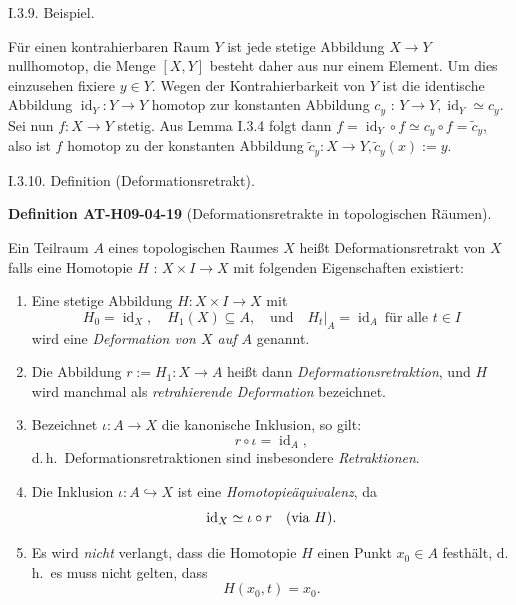 \documentclass[10pt, letterpaper]{article}
\newcommand{\CustomHeading}[3]{%
  \par\medskip\noindent%
  \textbf{#1 #2} \textnormal{(#3)}.\enskip%
}
\newenvironment{DEF}[2]{\begin{unitbox}\CustomHeading{Definition}{#1}{#2}}{\end{unitbox}}
\begin{document}
I.3.9. Beispiel. 

Für einen kontrahierbaren Raum $Y$ ist jede stetige Abbildung $X \rightarrow Y$ nullhomotop, die Menge $[X, Y]$ besteht daher aus nur einem Element. Um dies einzusehen fixiere $y \in Y$. Wegen der Kontrahierbarkeit von $Y$ ist die identische Abbildung $\operatorname{id}_{Y}: Y \rightarrow Y$ homotop zur konstanten Abbildung $c_{y}$ : $Y \rightarrow Y, \operatorname{id}_{Y} \simeq c_{y}$. Sei nun $f: X \rightarrow Y$ stetig. Aus Lemma I.3.4 folgt dann $f=\operatorname{id}_{Y} \circ f \simeq c_{y} \circ f=\tilde{c}_{y}$, also ist $f$ homotop zu der konstanten Abbildung $\tilde{c}_{y}: X \rightarrow Y, \tilde{c}_{y}(x):=y$.


I.3.10. Definition (Deformationsretrakt). 

\begin{DEF}{AT-H09-04-19}{Deformationsretrakte in topologischen Räumen}
Ein Teilraum $A$ eines topologischen Raumes $X$ heißt Deformationsretrakt von $X$ falls eine Homotopie $H$ : $X \times I \rightarrow X$ mit folgenden Eigenschaften existiert:
\begin{enumerate}
\item Eine stetige Abbildung \( H: X \times I \rightarrow X \) mit
\[
H_0 = \operatorname{id}_X, \quad H_1(X) \subseteq A, \quad \text{und} \quad H_t|_A = \operatorname{id}_A \ \text{für alle } t \in I
\]
wird eine \emph{Deformation von \( X \) auf \( A \)} genannt.

\item Die Abbildung \( r := H_1: X \rightarrow A \) heißt dann \emph{Deformationsretraktion}, und \( H \) wird manchmal als \emph{retrahierende Deformation} bezeichnet.

\item Bezeichnet \( \iota: A \rightarrow X \) die kanonische Inklusion, so gilt:
\[
r \circ \iota = \operatorname{id}_A,
\]
d.\,h.\ Deformationsretraktionen sind insbesondere \emph{Retraktionen}.

\item Die Inklusion \( \iota: A \hookrightarrow X \) ist eine \emph{Homotopieäquivalenz}, da
\[
\operatorname{id}_X \simeq \iota \circ r \quad \text{(via \( H \))}.
\]

\item Es wird \emph{nicht} verlangt, dass die Homotopie \( H \) einen Punkt \( x_0 \in A \) festhält, d.\,h.\ es muss nicht gelten, dass
\[
H(x_0, t) = x_0.
\]
\end{enumerate}
\end{DEF}
\end{document}
